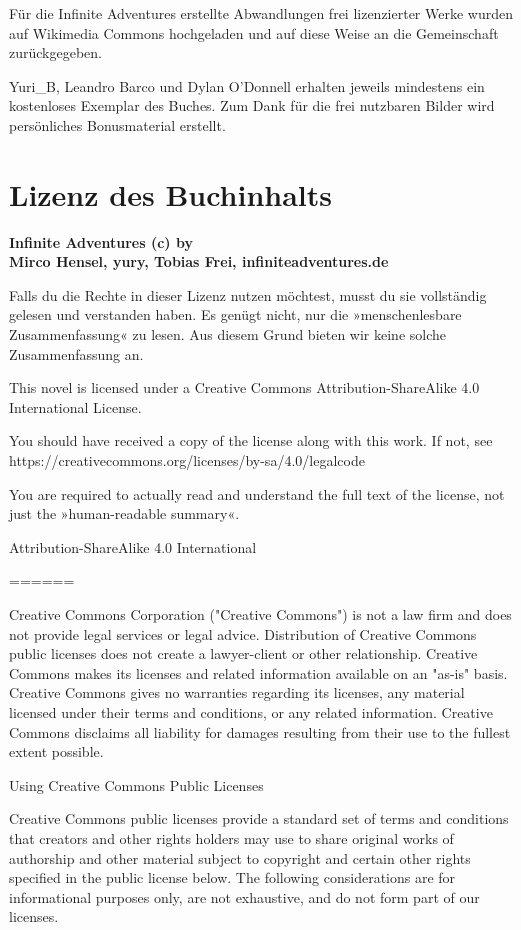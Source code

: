 Für die Infinite Adventures erstellte Abwandlungen frei lizenzierter Werke wurden auf Wikimedia Commons hochgeladen und auf diese Weise an die Gemeinschaft zurückgegeben.

Yuri\_B, Leandro Barco und Dylan O'Donnell erhalten jeweils mindestens ein kostenloses Exemplar des Buches. Zum Dank für die frei nutzbaren Bilder wird persönliches Bonusmaterial erstellt.


\chapter{Lizenz des Buchinhalts}

\textbf{Infinite Adventures (c) by\\ Mirco Hensel, yury, Tobias Frei, infiniteadventures.de}

Falls du die Rechte in dieser Lizenz nutzen möchtest, musst du sie vollständig gelesen und verstanden haben. Es genügt nicht, nur die »menschenlesbare Zusammenfassung« zu lesen. Aus diesem Grund bieten wir keine solche Zusammenfassung an.

This novel is licensed under a
Creative Commons Attribution-ShareAlike 4.0 International License.

You should have received a copy of the license along with this
work. If not, see https://creativecommons.org/licenses/by-sa/4.0/legalcode

You are required to actually read and understand the full text of the license, not just the »human-readable summary«.

Attribution-ShareAlike 4.0 International

======

Creative Commons Corporation ("Creative Commons") is not a law firm and
does not provide legal services or legal advice. Distribution of
Creative Commons public licenses does not create a lawyer-client or
other relationship. Creative Commons makes its licenses and related
information available on an "as-is" basis. Creative Commons gives no
warranties regarding its licenses, any material licensed under their
terms and conditions, or any related information. Creative Commons
disclaims all liability for damages resulting from their use to the
fullest extent possible.

Using Creative Commons Public Licenses

Creative Commons public licenses provide a standard set of terms and
conditions that creators and other rights holders may use to share
original works of authorship and other material subject to copyright
and certain other rights specified in the public license below. The
following considerations are for informational purposes only, are not
exhaustive, and do not form part of our licenses.


